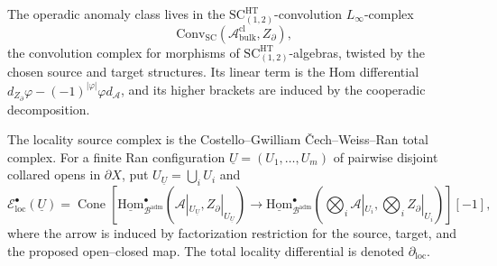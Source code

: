 \begin{defn}
  The operadic anomaly class lives in the
  \(\mathrm{SC}^{\mathrm{HT}}_{(1,2)}\)-convolution \(L_\infty\)-complex
  \[
    \mathrm{Conv}_{\mathrm{SC}}
    (\mathcal A^{\mathrm{cl}}_{\mathrm{bulk}},Z_\partial),
  \]
  the convolution complex for morphisms of
  \(\mathrm{SC}^{\mathrm{HT}}_{(1,2)}\)-algebras, twisted by the chosen
  source and target structures.  Its linear term is the Hom differential
  \(d_{Z_\partial}\varphi-(-1)^{|\varphi|}\varphi d_{\mathcal A}\), and
  its higher brackets are induced by the cooperadic decomposition.

  The locality source complex is the Costello--Gwilliam
  \v{C}ech--Weiss--Ran total complex.  For a finite Ran configuration
  \(\underline U=(U_1,\ldots,U_m)\) of pairwise disjoint collared opens in
  \(\partial X\), put \(U_{\underline U}=\bigcup_iU_i\) and
  \[
    \mathcal E^\bullet_{\mathrm{loc}}(\underline U)
    =
    \operatorname{Cone}\!\left[
    \underline{\mathrm{Hom}}^\bullet_{\mathcal B^{\mathrm{adm}}}
      (\mathcal A|_{U_{\underline U}},Z_\partial|_{U_{\underline U}})
    \longrightarrow
    \underline{\mathrm{Hom}}^\bullet_{\mathcal B^{\mathrm{adm}}}
      \!\left(\bigotimes_i\mathcal A|_{U_i},
      \bigotimes_i Z_\partial|_{U_i}\right)
    \right][-1],
  \]
  where the arrow is induced by factorization restriction for the source,
  target, and the proposed open--closed map.  The total locality
  differential is denoted \(\partial_{\mathrm{loc}}\).
\end{defn}

